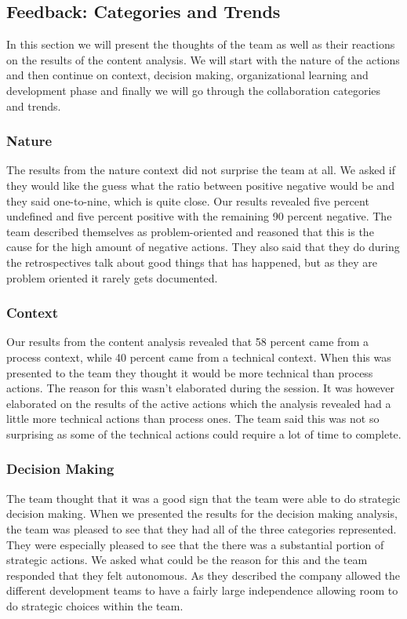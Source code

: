 \subsection{Feedback: Categories and Trends}
In this section we will present the thoughts of the team as well as their reactions on the results of the content analysis. We will start with the nature of the actions and then continue on context, decision making, organizational learning and development phase and finally we will go through the collaboration categories and trends. 

\subsubsection{Nature}
The results from the nature context did not surprise the team at all. We asked if they would like the guess what the ratio between positive negative would be and they said one-to-nine, which is quite close. Our results revealed five percent undefined and five percent positive with the remaining 90 percent negative. The team described themselves as problem-oriented and reasoned that this is the cause for the high amount of negative actions. They also said that they do during the retrospectives talk about good things that has happened, but as they are problem oriented it rarely gets documented. 

\subsubsection{Context}
Our results from the content analysis revealed that 58 percent came from a process context, while 40 percent came from a technical context. When this was presented to the team they thought it would be more technical than process actions. The reason for this wasn't elaborated during the session. It was however elaborated on the results of the active actions which the analysis revealed had a little more technical actions than process ones. The team said this was not so surprising as some of the technical actions could require a lot of time to complete. 

\subsubsection{Decision Making}
The team thought that it was a good sign that the team were able to do strategic decision making. When we presented the results for the decision making analysis, the team was pleased to see that they had all of the three categories represented. They were especially pleased to see that the there was a substantial portion of strategic actions. We asked what could be the reason for this and the team responded that they felt autonomous. As they described the company allowed the different development teams to have a fairly large independence allowing room to do strategic choices within the team. 

